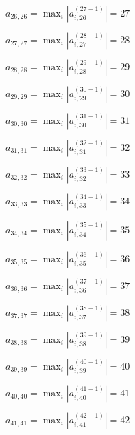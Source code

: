 \documentclass[a4paper,12pt]{article}
\begin{document}
$a _{ 26, 26 } =  \max _i |a _{ i, 26 } ^{ (27 - 1) } | = 27$

$a _{ 27, 27 } =  \max _i |a _{ i, 27 } ^{ (28 - 1) } | = 28$

$a _{ 28, 28 } =  \max _i |a _{ i, 28 } ^{ (29 - 1) } | = 29$

$a _{ 29, 29 } =  \max _i |a _{ i, 29 } ^{ (30 - 1) } | = 30$

$a _{ 30, 30 } =  \max _i |a _{ i, 30 } ^{ (31 - 1) } | = 31$

$a _{ 31, 31 } =  \max _i |a _{ i, 31 } ^{ (32 - 1) } | = 32$

$a _{ 32, 32 } =  \max _i |a _{ i, 32 } ^{ (33 - 1) } | = 33$

$a _{ 33, 33 } =  \max _i |a _{ i, 33 } ^{ (34 - 1) } | = 34$

$a _{ 34, 34 } =  \max _i |a _{ i, 34 } ^{ (35 - 1) } | = 35$

$a _{ 35, 35 } =  \max _i |a _{ i, 35 } ^{ (36 - 1) } | = 36$

$a _{ 36, 36 } =  \max _i |a _{ i, 36 } ^{ (37 - 1) } | = 37$

$a _{ 37, 37 } =  \max _i |a _{ i, 37 } ^{ (38 - 1) } | = 38$

$a _{ 38, 38 } =  \max _i |a _{ i, 38 } ^{ (39 - 1) } | = 39$

$a _{ 39, 39 } =  \max _i |a _{ i, 39 } ^{ (40 - 1) } | = 40$

$a _{ 40, 40 } =  \max _i |a _{ i, 40 } ^{ (41 - 1) } | = 41$

$a _{ 41, 41 } =  \max _i |a _{ i, 41 } ^{ (42 - 1) } | = 42$
\end{document}
